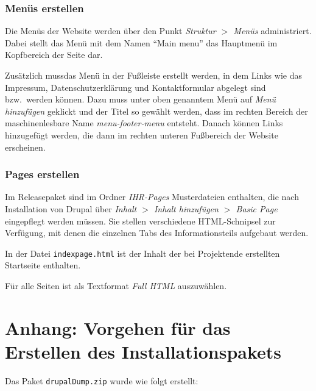 \documentclass[a4paper,11pt,twoside]{article}
\begin{document}
\subsubsection{Menüs erstellen}
Die Menüs der Website werden über den Punkt \textit{Struktur $>$ Menüs}
administriert. Dabei stellt das Menü mit dem Namen "`Main menu"' das Hauptmenü
im Kopfbereich der Seite dar.

Zusätzlich mussdas Menü in der Fußleiste erstellt werden, in dem Links wie das
Impressum, Datenschutzerklärung und Kontaktformular abgelegt sind bzw.\ werden
können.  Dazu muss unter oben genanntem Menü auf \emph{Menü hinzufügen}
geklickt und der Titel so gewählt werden, dass im rechten Bereich der
maschinenlesbare Name \textit{menu-footer-menu} entsteht. Danach können Links
hinzugefügt werden, die dann im rechten unteren Fußbereich der Website
erscheinen.

\subsubsection{Pages erstellen}
Im Releasepaket sind im Ordner \emph{IHR-Pages} Musterdateien enthalten, die
nach Installation von Drupal über \textit{Inhalt $>$ Inhalt hinzufügen $>$
  Basic Page} eingepflegt werden müssen. Sie stellen verschiedene
HTML-Schnipsel zur Verfügung, mit denen die einzelnen Tabs des
Informationsteils aufgebaut werden.

In der Datei \texttt{indexpage.html} ist der Inhalt der bei Projektende
erstellten Startseite enthalten. 

Für alle Seiten ist als Textformat \emph{Full HTML} auszuwählen.

\section{Anhang: Vorgehen für das Erstellen des Installationspakets}

Das Paket \texttt{drupalDump.zip} wurde wie folgt erstellt: 
\end{document}
